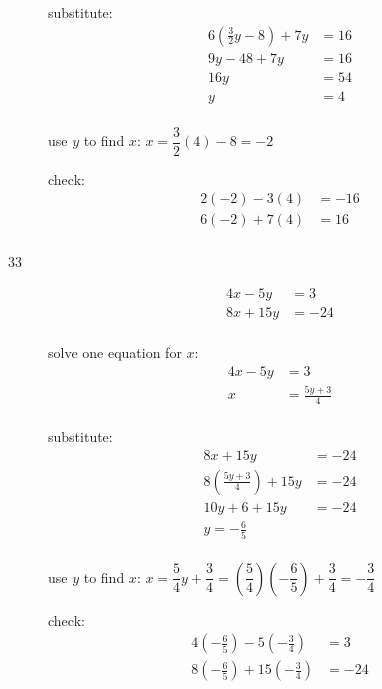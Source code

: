 \documentclass[fleqn,addpoints]{exam}
\begin{document}
\begin{description}
substitute:
\begin{align*}
  6 \left( \frac{3}{2}y - 8 \right) + 7y &= 16 \\
  9y - 48 + 7y &= 16 \\
  16y &= 54 \\
  y &= 4 \\
\end{align*}

use $y$ to find $x$: $x = \dfrac{3}{2}(4) - 8 = -2$

\vspace{0.2 cm}
\vspace{0.2 cm}

check:
\begin{align*}
  2(-2)-3(4) &= -16 \\
  6(-2) + 7(4) &= 16 \\
\end{align*}

\item[33]
\begin{align*}
  4x-5y &= 3 \\
  8x + 15y &= -24 \\
\end{align*}

solve one equation for $x$:
\begin{align*}
  4x-5y &= 3 \\
  x &= \frac{5y+3}{4} \\
\end{align*}

substitute:
\begin{align*}
  8x + 15y &= -24 \\
  8 \left( \frac{5y+3}{4} \right) + 15y &= -24 \\
  10y + 6 + 15y &= -24 \\
  y = - \frac{6}{5} \\
\end{align*}

use $y$ to find $x$: $x = \dfrac{5}{4} y + \dfrac{3}{4} 
  = \left( \dfrac{5}{4} \right) \left( - \dfrac{6}{5} \right) + \dfrac{3}{4} = - \dfrac{3}{4}$

\vspace{0.2 cm}
\vspace{0.2 cm}

check:
\begin{align*}
  4\left( -\frac{6}{5} \right)-5\left( - \frac{3}{4} \right) &= 3 \\
  8\left( -\frac{6}{5} \right) + 15\left( - \frac{3}{4} \right) &= -24 \\
\end{align*}


\end{description}
\end{document}
